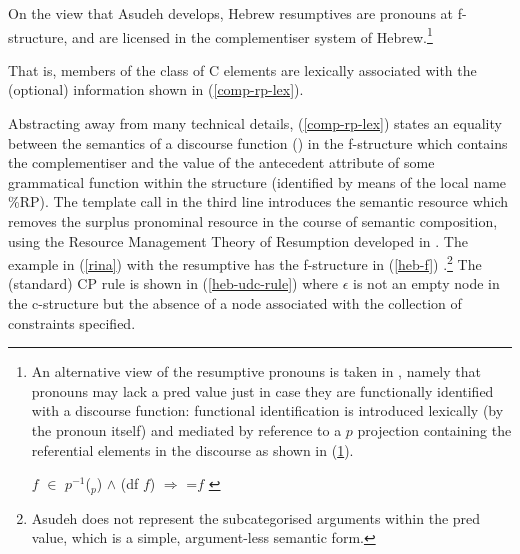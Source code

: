 \documentclass[output=paper,hidelinks]{langscibook}
\begin{document}
On the view that Asudeh develops, Hebrew resumptives are pronouns at f-structure, and  are licensed in the complementiser system of Hebrew.\footnote{An alternative view of the resumptive pronouns is taken in \citet{Falk2002}, namely that pronouns may lack a {\sc pred} value just in case they are functionally identified with a discourse function: functional identification is introduced lexically (by the pronoun itself) and mediated by reference to a $p$ projection containing the referential elements in the discourse as shown in (\ref{ex:fn25}).

\ea\label{ex:fn25}
$f$  $\in$ $p^{-1}$(\UP$_{p}$)  $\wedge$ ({\sc df} $f$) $\Rightarrow$ \UP=$f$
\hfill {\citep[163]{Falk2002} }
\z }

  That is, members of the class of C elements are lexically associated
with the (optional) information shown in (\ref{comp-rp-lex}).

\ea
\label{comp-rp-lex}
 \hfill{\citep[221]{Asudeh12}}
\z




Abstracting away from many technical details, (\ref{comp-rp-lex})  states an equality between the semantics of a discourse function () in the f-structure which contains the complementiser and the value of the {\sc antecedent} attribute of some grammatical function within the structure (identified by means of the local name \%RP). The template call in the third line introduces the semantic resource which removes the surplus pronominal resource in the course of semantic composition, using the Resource Management Theory of Resumption developed in \citet{Asudeh12}.  The example in (\ref{rina}) with the resumptive has the f-structure in (\ref{heb-f}) \citep[227]{Asudeh12}.\footnote{Asudeh does not represent the subcategorised arguments within the {\sc pred} value, which is a simple, argument-less semantic form.} The (standard) CP rule is shown in (\ref{heb-udc-rule}) \citep[224]{Asudeh12}
 where $\epsilon$ is not an empty node in the c-structure but the absence of a node associated with the collection of constraints specified.
\end{document}
